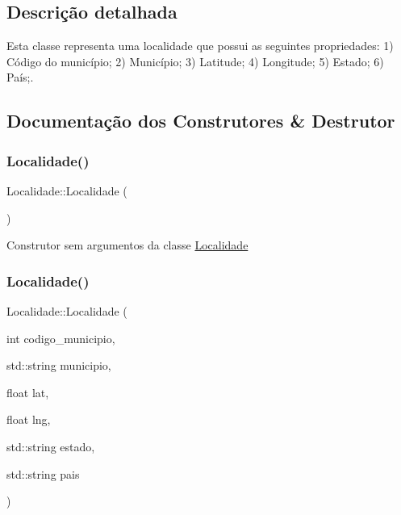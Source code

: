 \subsection{Descrição detalhada}
Esta classe representa uma localidade que possui as seguintes propriedades\+: 1) Código do município; 2) Município; 3) Latitude; 4) Longitude; 5) Estado; 6) País;. 

\subsection{Documentação dos Construtores \& Destrutor}
\mbox{\label{classLocalidade_ae06850bc156d0e7fdc9b04b0a64d14bf}} 
\subsubsection{\texorpdfstring{Localidade()}{Localidade()}\hspace{0.1cm}{\footnotesize\ttfamily [1/2]}}
{\footnotesize\ttfamily Localidade\+::\+Localidade (\begin{DoxyParamCaption}{ }\end{DoxyParamCaption})}

Construtor sem argumentos da classe \hyperlink{classLocalidade}{Localidade}\mbox{\label{classLocalidade_afba433c839d548dac5a04b3ff5e90082}} 
\subsubsection{\texorpdfstring{Localidade()}{Localidade()}\hspace{0.1cm}{\footnotesize\ttfamily [2/2]}}
{\footnotesize\ttfamily Localidade\+::\+Localidade (\begin{DoxyParamCaption}\item[{int}]{codigo\+\_\+municipio,  }\item[{std\+::string}]{municipio,  }\item[{float}]{lat,  }\item[{float}]{lng,  }\item[{std\+::string}]{estado,  }\item[{std\+::string}]{pais }\end{DoxyParamCaption})}


